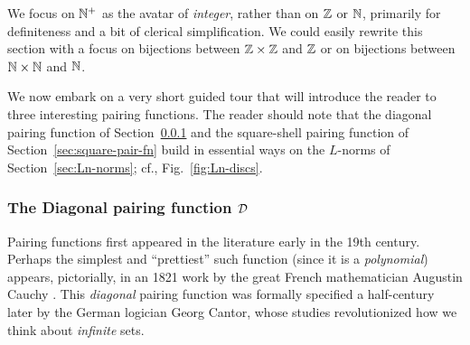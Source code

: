 \bigskip

\noindent {}
\bigskip

We focus on $\mathbb{N}^+$ as the avatar of {\it integer}, rather than on $\mathbb{Z}$
or $\mathbb{N}$, primarily for definiteness and a bit of clerical
simplification.  We could easily rewrite this section with a focus on
bijections between $\mathbb{Z} \times \mathbb{Z}$ and $\mathbb{Z}$ or on bijections between
$\mathbb{N} \times \mathbb{N}$ and $\mathbb{N}$.

\bigskip

We now embark on a very short guided tour that will introduce the
reader to three interesting pairing functions.  The reader should note
that the diagonal pairing function of Section~\ref{sec:diag-pair-fn}
and the square-shell pairing function of
Section~\ref{sec:square-pair-fn} build in essential ways on the
$L$-norms of Section~\ref{sec:Ln-norms}; cf., Fig.~\ref{fig:Ln-discs}.

\subsubsection{The Diagonal pairing function $\mbox{$\cal D$}$}
\label{sec:diag-pair-fn}

Pairing functions first appeared in the literature early in the 19th
century.  Perhaps the simplest and ``prettiest'' such function (since
it is a {\em polynomial}) appears, pictorially, in an 1821 work by the
great French mathematician Augustin Cauchy \cite{Cauchy21}.
%
This {\em diagonal} pairing function was formally specified a
half-century later by the German logician Georg Cantor,
%
whose studies \cite{Cantor74,Cantor78} revolutionized how we think
about {\em infinite} sets.


